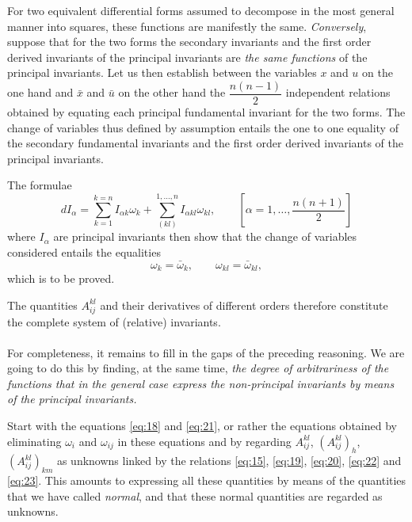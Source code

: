 \documentclass[leqno,12pt]{article}
\theoremstyle{shape1}
\theoremstyle{shape0}
\theoremstyle{shape2}
\theoremstyle{definition}
\begin{document}
For two equivalent differential forms assumed to decompose in the most general manner into squares, these functions are manifestly the same. \emph{Conversely}, suppose that for the two forms the secondary invariants and the first order derived invariants of the principal invariants are \emph{the same functions} of the principal invariants. Let us then establish between the variables $x$ and $u$ on the one hand and $\bar x$ and $\bar u$ on the other hand the $\dfrac{n(n-1)}{2}$ independent relations obtained by equating each principal fundamental invariant for the two forms. The change of variables thus defined by assumption entails the one to one equality of the secondary fundamental invariants and the first order derived invariants of the principal invariants.

The formulae
\[
dI_{\alpha}=\sum_{k=1}^{k=n}I_{\alpha k}\omega_{k}+\sum_{(kl)}^{1,\dots,n}I_{\alpha kl}\omega_{kl},\qquad\left[\alpha=1,\dots,\frac{n(n+1)}{2}\right]
\]
where $I_{\alpha}$ are principal invariants then show that the change of variables considered entails the equalities
\[
\omega_{k}=\bar \omega_{k},\qquad \omega_{kl}=\bar\omega_{kl},
\]
which is to be proved.

The quantities $A^{kl}_{ij}$ and their derivatives of different orders therefore constitute the complete system of (relative) invariants.


\paragraph{}
\label{sec:16}
For completeness, it remains to fill in the gaps of the preceding reasoning. We are going to do this by finding, at the same time, \emph{the degree of arbitrariness of the functions that in the general case express the non-principal invariants by means of the principal invariants.}

Start with the equations \eqref{eq:18} and \eqref{eq:21}, or rather the equations obtained by eliminating $\omega_{i}$ and $\omega_{ij}$ in these equations and by regarding $A^{kl}_{ij}$, $(A^{kl}_{ij})_{h}$, $(A^{kl}_{ij})_{km}$ as unknowns linked by the relations \eqref{eq:15}, \eqref{eq:19}, \eqref{eq:20}, \eqref{eq:22} and \eqref{eq:23}. This amounts to expressing all these quantities by means of the quantities that we have called \emph{normal}, and that these normal quantities are regarded as unknowns.
\end{document}
